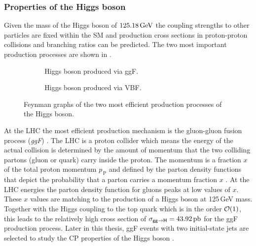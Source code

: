 \subsubsection{Properties of the Higgs boson}

%
Given the mass of the Higgs boson of $\text{125.18\,GeV}$ \cite{Patrignani:2016xqp} the coupling strengths to other particles are fixed within the SM and production cross sections in proton-proton collisions and branching ratios can be predicted.
The two most important production processes are shown in .\newline{}
\begin{figure}[h!]
    \centering
    \begin{subfigure}{.49\textwidth}
        \centering
         
        \caption{\,Higgs boson produced via ggF.}\label{theory:feynman_production:ggF}
    \end{subfigure}
    \begin{subfigure}{.49\textwidth}
        \centering
         
        \caption{\,Higgs boson produced via VBF.}\label{theory:feynman_production:VBF}
\end{subfigure}
    \caption[Higgs boson production processes.]{Feynman graphs of the two most efficient production processes of the Higgs boson.}\label{theory:feynman_production}
\end{figure}
At the LHC  the most efficient production mechanism is the gluon-gluon fusion process (\textit{ggF}) . The LHC is a proton collider which means the energy of the actual collision
is determined by the amount of momentum that the two colliding partons (gluon or quark) carry inside the proton. The momentum is a fraction $x$ of the total proton momentum $p_{\,\text{P}}$ and defined by the parton density functions that depict the probability that a parton carries a 
momentum fraction $x$ \cite{PhysRev.179.1547}. At the LHC energies the parton density function for gluons peaks at low values of $x$. These $x$ values are matching to the production of a Higgs boson at 125\,GeV mass.
Together with the Higgs coupling to the top quark which is in the order $\mathcal O \text{(1)}$, this leads to the relatively high cross section of $\mathsf{\sigma_{gg\rightarrow H}} = \text{43.92\,pb}$ \cite{Heinemeyer:2013tqa}
for the ggF production process. Later in this thesis, ggF events with two initial-state jets are selected to study the CP properties of the Higgs boson . 

